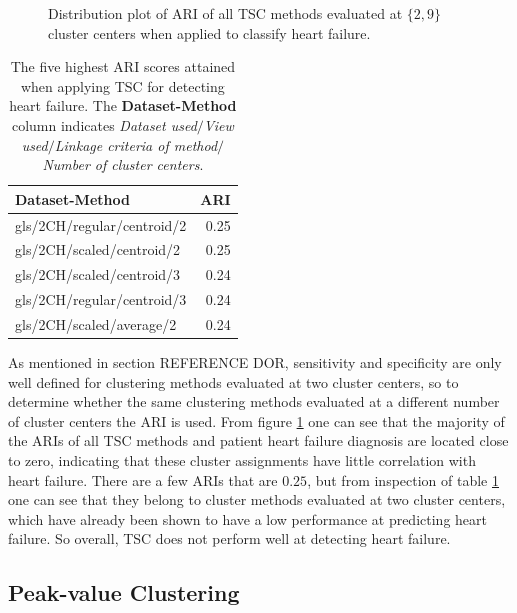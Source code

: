 \begin{figure}[htb]
    \centering
    
    \caption{Distribution plot of ARI of all TSC methods evaluated at $\{2,9\}$ cluster centers when applied to classify heart failure.}
    \label{fig:tsc_hf_ari}
\end{figure}

\begin{table}[htb]
    \centering
    \begin{tabular}{lr}
        \toprule
        Dataset-Method             &  ARI \\
        \midrule
        gls/2CH/regular/centroid/2 & 0.25 \\
        gls/2CH/scaled/centroid/2  & 0.25 \\
        gls/2CH/scaled/centroid/3  & 0.24 \\
        gls/2CH/regular/centroid/3 & 0.24 \\
        gls/2CH/scaled/average/2   & 0.24 \\
        \bottomrule
    \end{tabular}
    \caption{The five highest ARI scores attained when applying TSC for detecting heart failure.
             The \textbf{Dataset-Method} column indicates \textit{Dataset used}$/$\textit{View used}$/$\textit{Linkage criteria of method}$/$\textit{Number of cluster centers}.}
    \label{tab:tsc_hf_ari}
\end{table}

As mentioned in section REFERENCE DOR, sensitivity and specificity are only well defined for clustering methods evaluated at two cluster centers,
so to determine whether the same clustering methods evaluated at a different number of cluster centers the ARI is used.
From figure \ref{fig:tsc_hf_ari} one can see that the majority of the ARIs of all TSC methods and patient heart failure diagnosis are located close to zero, 
indicating that these cluster assignments have little correlation with heart failure. 
There are a few ARIs that are $0.25$, but from inspection of table \ref{tab:tsc_hf_ari} one can see that they belong to cluster methods evaluated at two cluster centers, 
which have already been shown to have a low performance at predicting heart failure.
So overall, TSC does not perform well at detecting heart failure. \bigskip
\newpage

\subsection{Peak-value Clustering}


